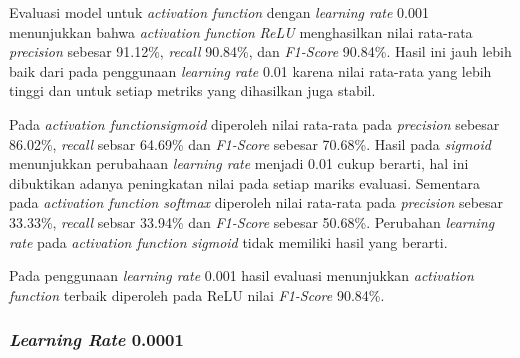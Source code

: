 \vspace{1cm}


    Evaluasi model untuk \textit{activation function} dengan \textit{learning rate} 0.001 menunjukkan bahwa \textit{activation function} \textit{ReLU} menghasilkan nilai rata-rata \textit{precision} sebesar 91.12\%, \textit{recall} 90.84\%, dan \textit{ F1-Score} 90.84\%. Hasil ini jauh lebih baik dari pada penggunaan \textit{learning rate} 0.01 karena nilai rata-rata yang lebih tinggi dan untuk setiap metriks yang dihasilkan juga stabil. 
    
     Pada \textit{activation function}\textit{sigmoid} diperoleh nilai rata-rata pada \textit{precision} sebesar 86.02\%, \textit{recall} sebsar 64.69\% dan\textit{ F1-Score} sebesar 70.68\%. Hasil pada \textit{sigmoid} menunjukkan perubahaan \textit{learning rate} menjadi 0.01 cukup berarti, hal ini dibuktikan adanya peningkatan nilai pada setiap mariks evaluasi. Sementara pada \textit{activation function} \textit{softmax} diperoleh nilai rata-rata pada \textit{precision} sebesar 33.33\%, \textit{recall} sebsar 33.94\% dan\textit{ F1-Score} sebesar 50.68\%.
     Perubahan \textit{learning rate} pada \textit{activation function} \textit{sigmoid} tidak memiliki hasil yang berarti. 
     
     Pada penggunaan \textit{learning rate} 0.001 hasil evaluasi menunjukkan \textit{activation function} terbaik diperoleh pada ReLU nilai \textit{ F1-Score} 90.84\%.
     
  

    

   \subsubsection{\textit{Learning Rate} 0.0001} 

